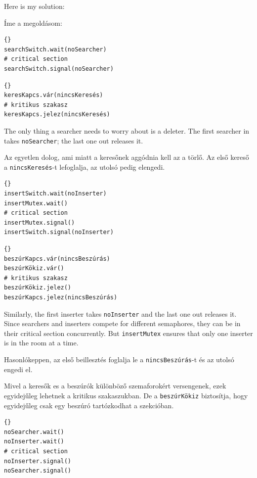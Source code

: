 \documentclass{book}
\begin{document}
Here is my solution:

Íme a megoldásom:

\begin{lstlisting}[title={Search-Insert-Delete solution (searcher)}]{}
searchSwitch.wait(noSearcher)
# critical section
searchSwitch.signal(noSearcher)
\end{lstlisting}

\begin{lstlisting}[title={Keres-beszúr-töröl megoldás (keresők)}]{}
keresKapcs.vár(nincsKeresés)
# kritikus szakasz
keresKapcs.jelez(nincsKeresés)
\end{lstlisting}

The only thing a searcher needs to worry about is a deleter.
The first searcher in takes {\tt noSearcher}; the last one out
releases it.

Az egyetlen dolog, ami miatt a keresőnek aggódnia kell az a törlő.
Az első kereső a {\tt nincsKeresés}-t lefoglalja, az utolsó pedig elengedi.

\begin{lstlisting}[title={Search-Insert-Delete solution (inserter)}]{}
insertSwitch.wait(noInserter)
insertMutex.wait()
# critical section
insertMutex.signal()
insertSwitch.signal(noInserter)
\end{lstlisting}

\begin{lstlisting}[title={Keres-beszúr-töröl megoldás (beszúrók)}]{}
beszúrKapcs.vár(nincsBeszúrás)
beszúrKökiz.vár()
# kritikus szakasz
beszúrKökiz.jelez()
beszúrKapcs.jelez(nincsBeszúrás)
\end{lstlisting}

Similarly, the first inserter takes {\tt noInserter} and the last one
out releases it.  Since searchers and inserters compete for different
semaphores, they can be in their critical section concurrently.
But {\tt insertMutex} ensures that only one inserter is in the room
at a time.

Hasonlókeppen, az első beillesztés foglalja le a {\tt nincsBeszúrás}-t és az utolsó engedi el. 

Mivel a keresők es a beszúrók különböző szemaforokért versengenek,
ezek egyidejűleg lehetnek a kritikus szakaszukban. De a {\tt beszúrKökiz}
biztosítja, hogy egyidejűleg csak egy beszúró tartózkodhat a szekcióban.
 
\begin{lstlisting}[title={Search-Insert-Delete solution (deleter)}]{}
noSearcher.wait()
noInserter.wait()
# critical section
noInserter.signal()
noSearcher.signal()

\end{lstlisting}
\end{document}
